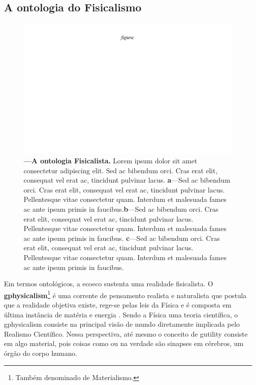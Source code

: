 \documentclass[./main.tex]{subfiles}
\begin{document}
\subsection{A ontologia do Fisicalismo} \label{subsec:physicalism}

\begin{figure}[t!] 
\centering				
\includegraphics[width=0.98\linewidth]{figs/fig_m.jpg}		
\caption[A ontologia Fisicalista]
{\textbf{---\;A ontologia Fisicalista.}
    Lorem ipsum dolor sit amet consectetur adipiscing elit. Sed ac bibendum orci. Cras erat elit, consequat vel erat ac, tincidunt pulvinar lacus. \;\textbf{a}\;---\;Sed ac bibendum orci. Cras erat elit, consequat vel erat ac, tincidunt pulvinar lacus. Pellentesque vitae consectetur quam. Interdum et malesuada fames ac ante ipsum primis in faucibus.\;\textbf{b}\;---\;Sed ac bibendum orci. Cras erat elit, consequat vel erat ac, tincidunt pulvinar lacus. Pellentesque vitae consectetur quam. Interdum et malesuada fames ac ante ipsum primis in faucibus. \;\textbf{c}\;---\;Sed ac bibendum orci. Cras erat elit, consequat vel erat ac, tincidunt pulvinar lacus. Pellentesque vitae consectetur quam. Interdum et malesuada fames ac ante ipsum primis in faucibus.
}
\label{fig:eco:physicalism} 		
\end{figure}

\par Em termos ontológicos, a \gls{ecoeco} sustenta uma realidade fisicalista. O \textbf{\gls{gphysicalism}}\footnote{Também denominado de Materialismo.} é uma corrente de pensamento realista e naturalista que postula que a realidade objetiva existe, rege-se pelas leis da Física e é composta em última instância de matéria e energia \cite{sep-physicalism}. Sendo a Física uma \gls{teoria} científica, o \gls{gphysicalism} consiste na principal visão de mundo diretamente implicada pelo Realismo Científico. Nessa perspectiva, até mesmo o conceito de \gls{gutility} consiste em algo material, pois coisas como  ou  na verdade são sinapses em cérebros, um órgão do corpo humano. 
\end{document}
